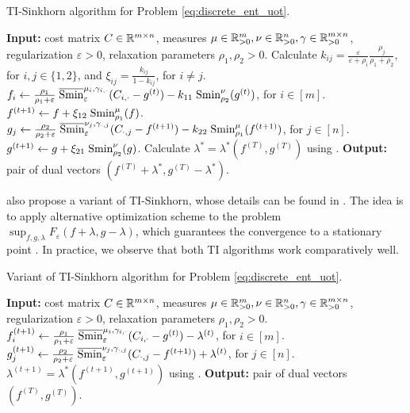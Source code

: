 \begin{algorithm}[t]
  \caption{TI-Sinkhorn algorithm for Problem \eqref{eq:discrete_ent_uot}.}
  \label{alg:TI_Sinkhorn}
\begin{algorithmic}[1]
  \STATE \textbf{Input:} cost matrix $C \in \mathbb R^{m \times n}$,
  measures $\mu \in \mathbb R^m_{> 0}, \nu \in \mathbb R^n_{> 0}, \gamma \in \mathbb R^{m \times n}_{> 0}$,
  regularization $\varepsilon > 0$, relaxation parameters $\rho_1, \rho_2 > 0$.
  \STATE Calculate $k_{ij} = \frac{\varepsilon}{\varepsilon + \rho_i}
  \frac{\rho_j}{\rho_1 + \rho_2}$,
  for $i, j \in \{ 1, 2\}$, and $\xi_{ij} = \frac{k_{ij}}{1 - k_{ij}}$, for $i \neq j$.
  \STATE $f_i \gets \frac{\rho_1}{\rho_1 + \varepsilon} \;
  \overline{\text{Smin}}^{\mu_i, \gamma_{i, \cdot}}_{\varepsilon}(C_{i, \cdot} - g^{(t)})
  - k_{11} \; \text{Smin}^{\nu}_{\rho_2}(g^{(t)})$, for $i \in [m]$.
  \STATE $f^{(t+1)} \gets f + \xi_{12} \; \text{Smin}^{\mu}_{\rho_1}(f)$.
  \STATE $g_j \gets \frac{\rho_2}{\rho_2 + \varepsilon} \;
  \overline{\text{Smin}}^{\nu_j, \gamma_{\cdot, j}}_{\varepsilon}(C_{\cdot, j} - f^{(t+1)})
  - k_{22} \; \text{Smin}^{\mu}_{\rho_1}(f^{(t+1)})$, for $j \in [n]$.
  \STATE $g^{(t+1)} \gets g + \xi_{21} \; \text{Smin}^{\nu}_{\rho_2}(g)$.
  \ENDFOR
  \STATE Calculate $\lambda^* = \lambda^*(f^{(T)}, g^{(T)})$ using .
  \STATE \textbf{Output:} pair of dual vectors $(f^{(T)} + \lambda^*, g^{(T)} - \lambda^*)$.
\end{algorithmic}
\end{algorithm}

\cite{Sejourne21} also propose a variant of TI-Sinkhorn, whose details can be found in
. The idea is to apply alternative optimization scheme to the problem
$\sup_{f, g, \lambda} F_{\varepsilon}(f + \lambda, g - \lambda)$, which guarantees
the convergence to a stationary point \citep{Tseng01}. In practice,
we observe that both TI algorithms work comparatively well.
\begin{algorithm}[t]
  \caption{Variant of TI-Sinkhorn algorithm for Problem \eqref{eq:discrete_ent_uot}.}
  \label{alg:TI_Sinkhorn_variant}
\begin{algorithmic}[1]
  \STATE \textbf{Input:} cost matrix $C \in \mathbb R^{m \times n}$,
  measures $\mu \in \mathbb R^m_{> 0}, \nu \in \mathbb R^n_{> 0}, \gamma \in \mathbb R^{m \times n}_{> 0}$,
  regularization $\varepsilon > 0$, relaxation parameters $\rho_1, \rho_2 > 0$.
  \STATE $f_i^{(t+1)} \gets \frac{\rho_1}{\rho_1 + \varepsilon} \;
  \overline{\text{Smin}}^{\mu_i, \gamma_{i, \cdot}}_{\varepsilon}(C_{i, \cdot} - g^{(t)})
  - \lambda^{(t)}$, for $i \in [m]$.
  \STATE $g_j^{(t+1)} \gets \frac{\rho_2}{\rho_2 + \varepsilon} \;
  \overline{\text{Smin}}^{\nu_j, \gamma_{\cdot, j}}_{\varepsilon}(C_{\cdot, j} - f^{(t+1)})
  + \lambda^{(t)}$, for $j \in [n]$.
  \STATE $\lambda^{(t+1)} = \lambda^*(f^{(t+1)}, g^{(t+1)})$ using .
  \ENDFOR
  \STATE \textbf{Output:} pair of dual vectors $(f^{(T)}, g^{(T)})$.
\end{algorithmic}
\end{algorithm}

